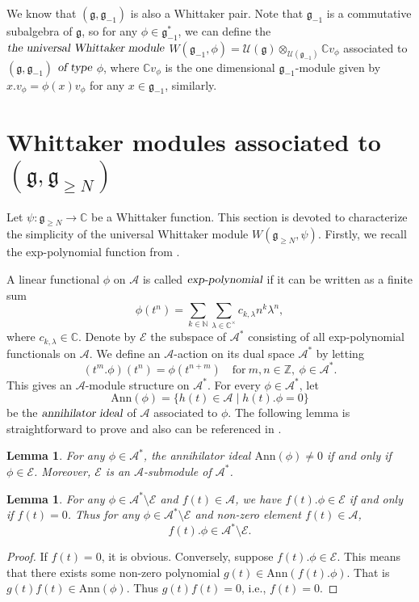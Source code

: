 \documentclass[12pt, a4paper]{amsart}
\newcommand{\fg}{\mathfrak g}
\newcommand{\C}{\mathbb{C}}
\newcommand{\N}{\mathbb N}
\newcommand{\Z}{\mathbb Z}
\newcommand{\U}{\mathcal{U}}
\theoremstyle{Theorem}
\theoremstyle{Theorem}
\newtheorem{lemma}[thm]{Lemma}
\numberwithin{equation}{section}
\begin{document}
We know that $(\fg,\fg_{-1})$ is also a Whittaker pair.
Note that $\fg_{-1}$ is a commutative subalgebra of $\fg$, so for any $\phi\in\fg_{-1}^*$,
we can define the $\textsl{the universal Whittaker module}$
$W(\fg_{-1},\phi)=\U(\fg)\otimes_{\U(\fg_{-1})}\C v_{\phi}$ associated to
$(\fg,\fg_{-1})$ $\textsl{of type}$ $\phi$,
where $\C v_{\phi}$ is the one dimensional $\fg_{-1}$-module given by
$x.v_{\phi}=\phi(x)v_{\phi}$ for any $x\in\fg_{-1}$, similarly.




\section{Whittaker modules associated to $(\fg,\fg_{\geq N})$}
Let $\psi:\fg_{\geq N}\rightarrow\C$ be a Whittaker function.
This section is devoted to characterize the simplicity of
the universal Whittaker module $W(\fg_{\geq N},\psi)$. Firstly, we recall the exp-polynomial
function from \cite{BZ}.

A linear functional $\phi$ on $\mathcal{A}$
is called $\textsl{exp-polynomial}$ if it can be written as a finite sum
\[\phi(t^{n})=\sum_{k\in\N}\sum_{\lambda\in\C^{\times}}c_{k,\lambda}n^{k}\lambda^{n},\]
where $c_{k,\lambda}\in\C$. Denote by $\mathcal{E}$ the subspace of $\mathcal{A}^*$ consisting
of all exp-polynomial functionals on $\mathcal{A}$.
We define an $\mathcal{A}$-action on its dual space $\mathcal{A}^*$ by letting
\[(t^{m}.\phi)(t^n)=\phi(t^{n+m})\quad\text{for}\ m,n\in\Z,\ \phi\in\mathcal{A}^*.\]
This gives an $\mathcal{A}$-module structure on $\mathcal{A}^*$.
For every $\phi\in\mathcal{A}^*$, let \[\mathrm{Ann}(\phi)=\{h(t)\in\mathcal{A}\mid h(t).\phi=0\}\]
be the $\textsl{annihilator ideal}$ of $\mathcal{A}$ associated to $\phi$.
The following lemma is straightforward to prove and also can be referenced in \cite[Proposition 2.3]{W1}.
\begin{lemma}\label{lem:charCE}
For any $\phi\in\mathcal{A}^*$,
the annihilator ideal $\mathrm{Ann}(\phi)\neq 0$ if and only if $\phi\in\mathcal{E}$. Moreover,
$\mathcal{E}$ is an $\mathcal{A}$-submodule of $\mathcal{A}^*$.
\end{lemma}


\begin{lemma}\label{lem:non-CE}
For any $\phi\in\mathcal{A}^*\setminus\mathcal{E}$ and $f(t)\in\mathcal{A}$, we have $f(t).\phi\in\mathcal{E}$ if and
only if $f(t)=0$. Thus for any $\phi\in\mathcal{A}^*\setminus\mathcal{E}$ and non-zero element $f(t)\in\mathcal{A}$, \[f(t).\phi\in\mathcal{A}^*\setminus\mathcal{E}.\]
\end{lemma}
\begin{proof}If $f(t)=0$, it is obvious. Conversely, suppose $f(t).\phi\in\mathcal{E}$. This means that
there exists some non-zero polynomial $g(t)\in\mathrm{Ann}(f(t).\phi)$. That is $g(t)f(t)\in\mathrm{Ann}(\phi)$.
Thus $g(t)f(t)=0$, i.e., $f(t)=0$.
\end{proof}
\end{document}
